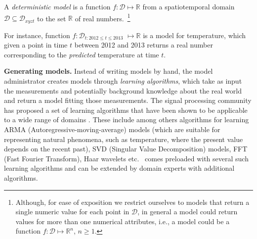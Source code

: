 \begin{defin}
A {\em deterministic model} is a function $f:\mathcal{D}\mapsto \mathbb{R}$ from a spatiotemporal domain $\mathcal{D} \subseteq \mathcal{D}_{xyzt}$ to the set $\mathbb{R}$ of real numbers.~\footnote{Although, for ease of exposition we restrict ourselves to models that return a single numeric value for each point in $\mathcal{D}$, in general a model could return values for more than one numerical attributes, i.e., a model could be a function  $f:\mathcal{D}\mapsto \mathbb{R}^n$, $n \ge 1$.}
\end{defin}

\begin{example}
For instance, function $f:\mathcal{D}_{t: 2012 \leq t \leq 2013}$ $\mapsto \mathbb{R}$ is a model for temperature, which given a point in time $t$ between 2012 and 2013 returns a real number corresponding to the \emph{predicted} temperature at time $t$.
\end{example}

{\bf Generating models.} Instead of writing models by hand, the model administrator creates models through {\em learning algorithms}, which take as input the measurements and potentially background knowledge about the real world and return a model fitting those measurements. The signal processing community has proposed a set of learning algorithms that have been shown to be applicable to a wide range of domains \cite{dsp}. These include among others algorithms for learning ARMA (Autoregressive-moving-average) models (which are suitable for representing natural phenomena, such as temperature, where the present value depends on the recent past), SVD (Singular Value Decomposition) models, FFT (Fast Fourier Transform), Haar wavelets etc. \projName\ comes preloaded with several such learning algorithms and can be extended by domain experts with additional algorithms.


